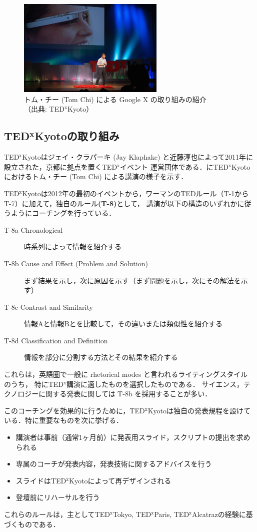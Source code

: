 \documentclass[submit,techreq,jkeyword,noauthor]{ipsj}
\newcommand{\TED}{\textrm{TED}}
\newcommand{\TEDx}{\TED${}^{\textrm{x}}$}
\newcommand{\TEDxTokyo}{\TEDx\textrm{Tokyo}}
\newcommand{\TEDxKyoto}{\TEDx\-\textrm{Kyoto}}
\newcommand{\TEDxParis}{\TEDx\textrm{Paris}}
\newcommand{\TEDxAlcatraz}{\TEDx\textrm{Alcatraz}}
\newcommand{\TEDtitle}{\textbf{TED}}
\newcommand{\TEDxtitle}{\TEDtitle${}^{\textbf{x}}$}
\newcommand{\TEDxKyototitle}{\TEDxtitle\textbf{Kyoto}}
\begin{document}
\begin{figure}[t]
\begin{center}
\includegraphics[width=7cm,clip]{tom_chi.png}
\end{center}
\caption{トム・チー (Tom Chi) による Google X の取り組みの紹介\\
（出典: \TEDxKyoto ）}
\label{fig:tomchi}
\end{figure}

\subsection{\TEDxKyototitle の取り組み}

\TEDxKyoto はジェイ・クラパーキ (Jay Klaphake) と近藤淳也によって2011年に設立された，京都に拠点を置く\TEDx イベント
運営団体である．に\TEDxKyoto におけるトム・チー (Tom Chi) による講演の様子を示す．

\TEDxKyoto は2012年の最初のイベントから，ワーマンの\TED ルール（T-1からT-7）に加えて，独自のルール\textbf{(T-8)}として，
講演が以下の構造のいずれかに従うようにコーチングを行っている．
\begin{description}
\item[T-8a Chronological] 時系列によって情報を紹介する
\item[T-8b Cause and Effect (Problem and Solution)] まず結果を示し，次に原因を示す（まず問題を示し，次にその解法を示す）
\item[T-8c Contrast and Similarity] 情報Aと情報Bとを比較して，その違いまたは類似性を紹介する
\item[T-8d Classification and Definition] 情報を部分に分割する方法とその結果を紹介する
\end{description}
これらは，英語圏で一般に rhetorical modes と言われるライティングスタイル \cite{cs} のうち，
特に\TEDx 講演に適したものを選択したものである．
サイエンス，テクノロジーに関する発表に関しては T-8b を採用することが多い．

このコーチングを効果的に行うために，\TEDxKyoto は独自の発表規程を設けている．特に重要なものを次に挙げる．
\begin{itemize}
\item 講演者は事前（通常1ヶ月前）に発表用スライド，スクリプトの提出を求められる
\item 専属のコーチが発表内容，発表技術に関するアドバイスを行う
\item スライドは\TEDxKyoto によって再デザインされる
\item 登壇前にリハーサルを行う
\end{itemize}
これらのルールは，主として\TEDxTokyo, \TEDxParis, \TEDxAlcatraz の経験に基づくものである．
\end{document}
